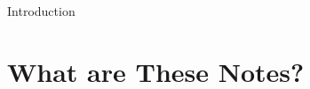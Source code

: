 \begin{chapter}{Introduction}


    \section{What are These Notes?}
    ~\cite{boyd_convex_optimization}

\end{chapter}